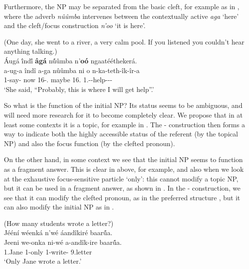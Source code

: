 \documentclass[output=paper]{langscibook}
\begin{document}
\z

Furthermore, the NP may be separated from the basic cleft, for example as in , where the adverb \textit{nûûmba} intervenes between the contextually active \textit{aga} ‘here’ and the cleft/focus construction \textit{n’oo} ‘it is here’.\pagebreak

\ea
\label{bkm:Ref117503860}
(One day, she went to a river, a very calm pool. If you listened you couldn’t hear anything talking.)\\
\'{A}ugá \'{î}nd\'{î} \textbf{âgá} n\'{û}ûmba n’\textbf{oó} ngaatééthekerá.\\
\gll
a-ug-a  îndî a-ga nûûmba ni o n-ka-teth-îk-îr-a\\
1\SM{}-say-\FV{} now 16-\DEM.\PROX{} maybe \textbf{\FOC{}} 16.\PRO{}  1\SG.\SM-\FUT{}-help-\ABL-\APPL-\FV{}\\
\glt
‘She said, “Probably, this is where I will get help”.’

\z


So what is the function of the initial NP? Its status seems to be ambiguous, and will need more research for it to become completely clear. We propose that in at least some contexts it is a topic, for example in . The \NI-\PRO{} construction then forms a way to indicate both the highly accessible status of the referent (by the topical NP) and also the focus function (by the clefted pronoun).

On the other hand, in some context we see that the initial NP seems to function as a fragment answer. This is clear in  above, for example, and also when we look at the exhaustive focus-sensitive particle ‘only’: this cannot modify a topic NP, but it can be used in a fragment answer, as shown in . In the \NI-\PRO{} construction, we see that it can modify the clefted pronoun, as in the preferred structure , but it can also modify the initial NP as in .

\ea
\ea
\label{bkm:Ref111725571}
(How many students wrote a letter?)\\
Jééní  wéenká  n’wé  áandîkiré    baar\'{û}a.\\
\gll
Jeeni  we-onka  ni-wé  a-andîk-ire    baar\'{û}a.\\
1.Jane  1-only \PRO{} 1\SM{}-write-\PFV{} 9.letter\\
\glt
‘Only Jane wrote a letter.’
\end{document}
